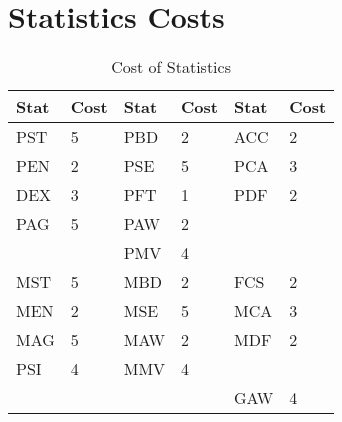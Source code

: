\section{Statistics Costs}

\begin{table}
	\begin{tabular}{llllll}
    Stat & Cost	&	Stat& Cost	& Stat	& Cost \\
\hline
	PST  & 5	&	PBD	&	2	&	ACC	&	2	\\
	PEN  & 2 	&	PSE	&	5	&	PCA	&	3	\\
	DEX  & 3	&	PFT	&	1	&	PDF	&	2	\\
	PAG  & 5	&	PAW	&	2	&		&		\\ 
		 & 		&	PMV	&	4	&		&		\\ 
	MST  & 5	&	MBD	&	2	&	FCS	&	2	\\
	MEN  & 2	&	MSE	&	5	&	MCA	&	3	\\
	MAG  & 5	&	MAW	&	2	&	MDF	&	2	\\
	PSI  & 4	&	MMV	&	4	&		&		\\ 
		 &		&		&		&	GAW	&	4	\\ 
	\end{tabular}
    \caption{Cost of Statistics}
\end{table}


